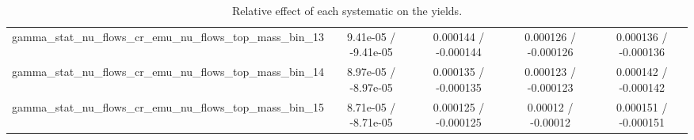 \documentclass[10pt]{article}
\begin{document}
\begin{table}[htbp]
\begin{center}
\begin{tabular}{|c|c|c|c|c|}
  gamma_stat_nu_flows_cr_emu_nu_flows_top_mass_bin_13 & 9.41e-05 / -9.41e-05 & 0.000144 / -0.000144 & 0.000126 / -0.000126 & 0.000136 / -0.000136 \\ 
  gamma_stat_nu_flows_cr_emu_nu_flows_top_mass_bin_14 & 8.97e-05 / -8.97e-05 & 0.000135 / -0.000135 & 0.000123 / -0.000123 & 0.000142 / -0.000142 \\ 
  gamma_stat_nu_flows_cr_emu_nu_flows_top_mass_bin_15 & 8.71e-05 / -8.71e-05 & 0.000125 / -0.000125 & 0.00012 / -0.00012 & 0.000151 / -0.000151 \\ 
\hline 
\end{tabular} 
\caption{Relative effect of each systematic on the yields.} 
\end{center} 
\end{table} 
\end{document}
